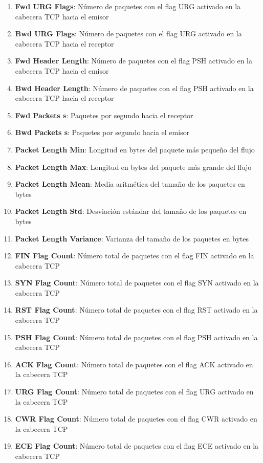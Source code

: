 \begin{enumerate}
    \item \textbf{Fwd URG Flags}: Número de paquetes con el flag URG activado en la cabecera TCP hacia el emisor
    \item \textbf{Bwd URG Flags}: Número de paquetes con el flag URG activado en la cabecera TCP hacia el receptor
    \item \textbf{Fwd Header Length}: Número de paquetes con el flag PSH activado en la cabecera TCP hacia el emisor
    \item \textbf{Bwd Header Length}: Número de paquetes con el flag PSH activado en la cabecera TCP hacia el receptor
    \item \textbf{Fwd Packets s}: Paquetes por segundo hacia el receptor
    \item \textbf{Bwd Packets s}: Paquetes por segundo hacia el emisor
    \item \textbf{Packet Length Min}: Longitud en bytes del paquete más pequeño del flujo
    \item \textbf{Packet Length Max}: Longitud en bytes del paquete más grande del flujo
    \item \textbf{Packet Length Mean}: Media aritmética del tamaño de los paquetes en bytes
    \item \textbf{Packet Length Std}: Desviación estándar del tamaño de los paquetes en bytes
    \item \textbf{Packet Length Variance}: Varianza del tamaño de los paquetes en bytes
    \item \textbf{FIN Flag Count}: Número total de paquetes con el flag FIN activado en la cabecera TCP
    \item \textbf{SYN Flag Count}: Número total de paquetes con el flag SYN activado en la cabecera TCP
    \item \textbf{RST Flag Count}: Número total de paquetes con el flag RST activado en la cabecera TCP
    \item \textbf{PSH Flag Count}: Número total de paquetes con el flag PSH activado en la cabecera TCP
    \item \textbf{ACK Flag Count}: Número total de paquetes con el flag ACK activado en la cabecera TCP
    \item \textbf{URG Flag Count}: Número total de paquetes con el flag URG activado en la cabecera TCP
    \item \textbf{CWR Flag Count}: Número total de paquetes con el flag CWR activado en la cabecera TCP
    \item \textbf{ECE Flag Count}: Número total de paquetes con el flag ECE activado en la cabecera TCP

\end{enumerate}

